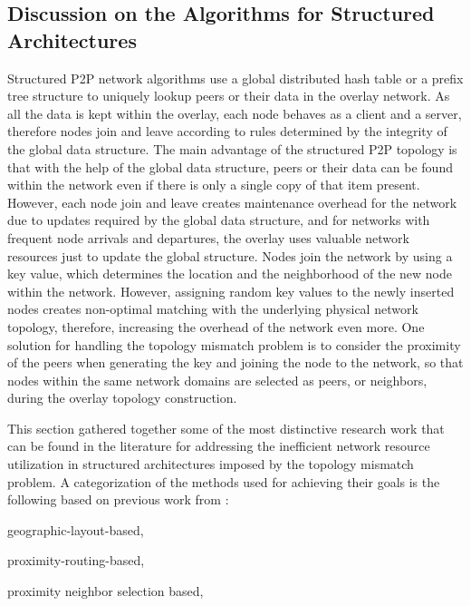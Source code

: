 \subsection{Discussion on the Algorithms for Structured Architectures}
Structured P2P network algorithms use a global distributed hash table or a
prefix tree structure to uniquely lookup peers or their data in the overlay
network. As all the data is kept within the overlay, each node behaves as a
client and a server, therefore nodes join and leave according to rules
determined by the integrity of the global data structure. The main advantage of
the structured P2P topology is that with the help of the global data structure,
peers or their data can be found within the network even if there is only a
single copy of that item present. However, each node join and leave creates
maintenance overhead for the network due to updates required by the global data
structure, and for networks with frequent node arrivals and departures, the
overlay uses valuable network resources just to update the global structure.
Nodes join the network by using a key value, which determines the location and
the neighborhood of the new node within the network. However, assigning
random key values to the newly inserted nodes creates non-optimal matching with
the underlying physical network topology, therefore, increasing the overhead of
the network even more. One solution for handling the topology mismatch problem
is to consider the proximity of the peers when generating the key and joining
the node to the network, so that nodes within the same network domains are
selected as peers, or neighbors, during the overlay topology construction.

This section gathered together some of the most distinctive research work that
can be found in the literature for addressing the inefficient network resource
utilization in structured architectures imposed by the topology mismatch
problem. A categorization of the methods used for achieving their goals is the
following based on previous work from
\cite{CDHR2002,CDCR2002,RSS2002}:
\begin{inparaenum}
  \item geographic-layout-based,
  \item proximity-routing-based,
  \item proximity neighbor selection based,
\end{inparaenum}

